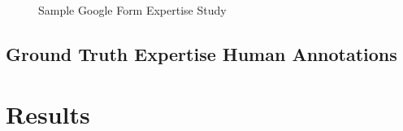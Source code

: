         \begin{figure}
            \centerline{
              \hfil
               }
            \caption{Sample Google Form Expertise Study} \label{fig:sampleSurvey}
        \end{figure}
        
    \subsection{Ground Truth Expertise Human Annotations\label{appendix:ground_truth_annotations}}
        
     
    
    \section{Results}
